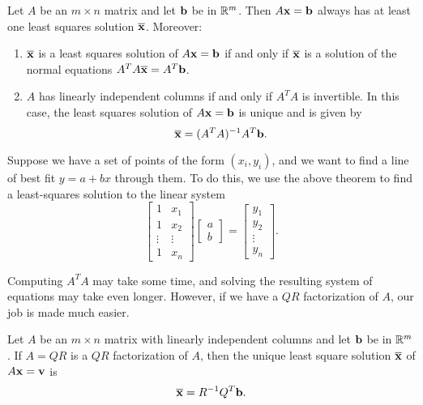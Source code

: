 \documentclass[../m073main.tex]{subfiles}
\begin{document}
\begin{theorem}
	Let $A$ be an $m \times n$ matrix and let $\mathbf{b}$ be in $\mathbb{R}^m$.
	Then $A \mathbf{x} = \mathbf{b}$ always has at least one least squares solution $\overline{\mathbf{x}}$.
	Moreover:
	\begin{enumerate}[label=(\alph*)]
		\item $\overline{\mathbf{x}}$ is a least squares solution of $A \mathbf{x} = \mathbf{b}$ if and only if $\overline{\mathbf{x}}$ is a solution of the normal equations $A^TA \overline{\mathbf{x}} = A^T \mathbf{b}$.
		\item $A$ has linearly independent columns if and only if $A^TA$ is invertible.
			  In this case, the least squares solution of $A \mathbf{x} = \mathbf{b}$ is unique and is given by
			  \[ \overline{\mathbf{x}} = (A^TA)^{-1}A^T \mathbf{b}. \]
	\end{enumerate}
\end{theorem}

Suppose we have a set of points of the form $(x_i, y_i)$, and we want to find a line of best fit $y = a + bx$ through them.
To do this, we use the above theorem to find a least-squares solution to the linear system
\[ \begin{bmatrix} 1 & x_1 \\ 1 & x_2 \\ \vdots & \vdots \\ 1 & x_n \end{bmatrix} \begin{bmatrix} a \\ b \end{bmatrix} = \begin{bmatrix} y_1 \\ y_2 \\ \vdots \\ y_n \end{bmatrix}. \]

Computing $A^T A$ may take some time, and solving the resulting system of equations may take even longer.
However, if we have a $QR$ factorization of $A$, our job is made much easier.

\begin{theorem}
	Let $A$ be an $m \times n$ matrix with linearly independent columns and let $\mathbf{b}$ be in $\mathbb{R}^m$.
	If $A = QR$ is a $QR$ factorization of $A$, then the unique least square solution $\overline{\mathbf{x}}$ of $A \mathbf{x} = \mathbf{v}$ is
	\[ \overline{\mathbf{x}} = R^{-1} Q^T \mathbf{b}. \]
\end{theorem}
\end{document}
